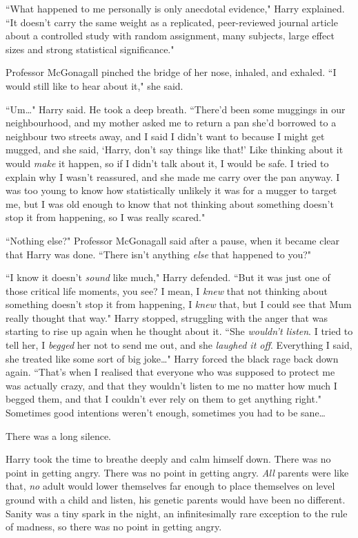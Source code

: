 ``What happened to me personally is only anecdotal evidence," Harry explained. ``It doesn't carry the same weight as a replicated, peer-reviewed journal article about a controlled study with random assignment, many subjects, large effect sizes and strong statistical significance."

Professor McGonagall pinched the bridge of her nose, inhaled, and exhaled. ``I would still like to hear about it," she said.

``Um…" Harry said. He took a deep breath. ``There'd been some muggings in our neighbourhood, and my mother asked me to return a pan she'd borrowed to a neighbour two streets away, and I said I didn't want to because I might get mugged, and she said, `Harry, don't say things like that!' Like thinking about it would \emph{make} it happen, so if I didn't talk about it, I would be safe. I tried to explain why I wasn't reassured, and she made me carry over the pan anyway. I was too young to know how statistically unlikely it was for a mugger to target me, but I was old enough to know that not thinking about something doesn't stop it from happening, so I was really scared."

``Nothing else?" Professor McGonagall said after a pause, when it became clear that Harry was done. ``There isn't anything \emph{else} that happened to you?"

``I know it doesn't \emph{sound} like much," Harry defended. ``But it was just one of those critical life moments, you see? I mean, I \emph{knew} that not thinking about something doesn't stop it from happening, I \emph{knew} that, but I could see that Mum really thought that way." Harry stopped, struggling with the anger that was starting to rise up again when he thought about it. ``She \emph{wouldn't listen}. I tried to tell her, I \emph{begged} her not to send me out, and she \emph{laughed it off}. Everything I said, she treated like some sort of big joke…" Harry forced the black rage back down again. ``That's when I realised that everyone who was supposed to protect me was actually crazy, and that they wouldn't listen to me no matter how much I begged them, and that I couldn't ever rely on them to get anything right." Sometimes good intentions weren't enough, sometimes you had to be sane…

There was a long silence.

Harry took the time to breathe deeply and calm himself down. There was no point in getting angry. There was no point in getting angry. \emph{All} parents were like that, \emph{no} adult would lower themselves far enough to place themselves on level ground with a child and listen, his genetic parents would have been no different. Sanity was a tiny spark in the night, an infinitesimally rare exception to the rule of madness, so there was no point in getting angry.

